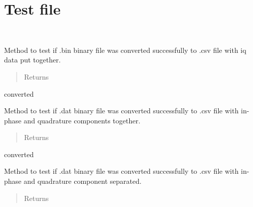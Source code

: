 \documentclass[letterpaper,10pt,english]{sphinxmanual}
\begin{document}
\section{Test file}
\label{\detokenize{test:test-file}}\label{\detokenize{test::doc}}\label{\detokenize{test:module-test}}

\begin{fulllineitems}
\label{\detokenize{test:test.TestParser}}~

\begin{fulllineitems}
\label{\detokenize{test:test.TestParser.test_TI}}
Method to test if .bin binary file was converted successfully to .csv file with iq data put together.
\begin{quote}\begin{description}
\item[{Returns}] \leavevmode


\end{description}\end{quote}

converted

\end{fulllineitems}


\begin{fulllineitems}
\label{\detokenize{test:test.TestParser.test_iq}}
Method to test if .dat binary file was converted successfully to .csv file with in-phase and quadrature
components together.
\begin{quote}\begin{description}
\item[{Returns}] \leavevmode


\end{description}\end{quote}

converted

\end{fulllineitems}


\begin{fulllineitems}
\label{\detokenize{test:test.TestParser.test_raw}}
Method to test if .dat binary file was converted successfully to .csv file with in-phase and quadrature
component separated.
\begin{quote}\begin{description}
\item[{Returns}] \leavevmode



\end{description}
\end{quote}
\end{fulllineitems}
\end{fulllineitems}
\end{document}
